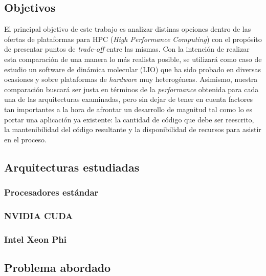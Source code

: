 \subsection{Objetivos}

El principal objetivo de este trabajo es analizar distinas opciones dentro de
las ofertas de plataformas para HPC (\textit{High Performance Computing}) con
el propósito de presentar puntos de \textit{trade-off} entre las mismas. Con la
intención de realizar esta comparación de una manera lo más realista posible,
se utilizará como caso de estudio un software de dinámica molecular (LIO) que
ha sido probado en diversas ocasiones y sobre plataformas de \textit{hardware}
muy heterogéneas. Asimismo, nuestra comparación buscará ser justa en términos
de la \textit{performance} obtenida para cada una de las arquitecturas
examinadas, pero sin dejar de tener en cuenta factores tan importantes a la
hora de afrontar un desarrollo de magnitud tal como lo es portar una
aplicación ya existente: la cantidad de código que debe ser reescrito, la
mantenibilidad del código resultante y la disponibilidad de recursos para
asistir en el proceso.

\subsection{Arquitecturas estudiadas}

\subsubsection{Procesadores est\'andar}



\subsubsection{NVIDIA CUDA}

\subsubsection{Intel Xeon Phi}



\subsection{Problema abordado}


